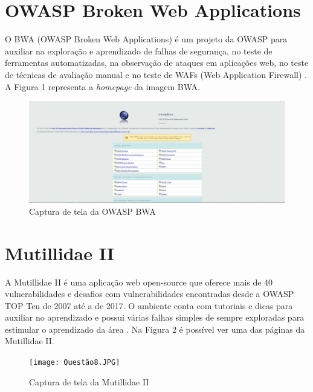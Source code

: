 \section{OWASP Broken Web Applications}

O BWA (OWASP Broken Web Applications) é um projeto da OWASP para auxiliar na exploração e aprendizado de falhas de segurança, no teste de ferramentas automatizadas, na observação de ataques em aplicações web, no teste de técnicas de avaliação manual e no teste de WAFs (Web Application Firewall) \cite{url:OWASPBWA}. A Figura 1 representa a \textit{homepage} da imagem BWA.

\begin{figure}[!htb]
     \centering
     \includegraphics[width=15cm]{OWASPBWA.JPG}
     \caption{Captura de tela da OWASP BWA}
     \label{Label de referência para a imagem}
\end{figure}

\section{Mutillidae II}

A Mutillidae II é uma aplicação web open-source que oferece mais de 40 vulnerabilidades e desafios com vulnerabilidades encontradas desde a OWASP TOP Ten de 2007 até a de 2017. O ambiente conta com tutoriais e dicas para auxiliar no aprendizado e possui várias falhas simples de sempre exploradas para estimular o aprendizado da área \cite{url:owaspmuti}. Na Figura 2 é possível ver uma das páginas da Mutillidae II.

\begin{figure}[!htb]
     \centering
     \texttt{[image: Questão8.JPG]}
     \caption{Captura de tela da Mutillidae II}
     \label{Label de referência para a imagem}
\end{figure}

